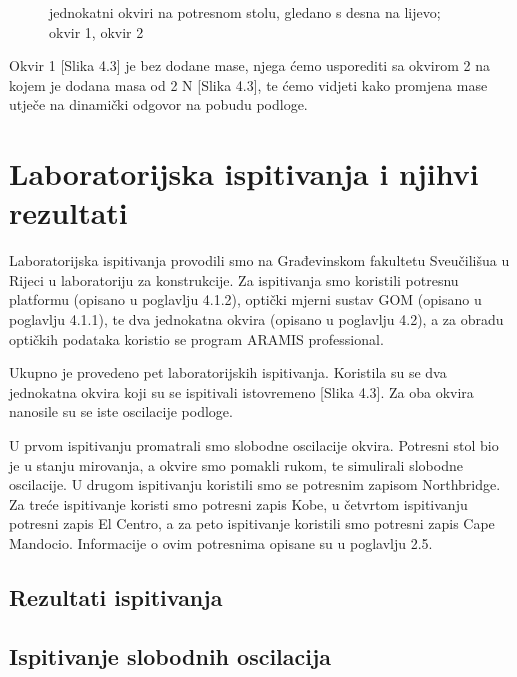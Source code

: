 \documentclass[12pt]{book}
\begin{document}
\begin{figure}[h]
	\centering
	\caption{jednokatni okviri na potresnom stolu, gledano s desna na lijevo; okvir 1, okvir 2}
	\label{fig:whatsapp-image-2023-09-06-at-18}
\end{figure}

Okvir 1 [Slika 4.3] je bez dodane mase, njega ćemo usporediti sa okvirom 2 na kojem je dodana masa od 2 N [Slika 4.3], te ćemo vidjeti kako promjena mase utječe na dinamički odgovor na pobudu podloge.

\chapter{Laboratorijska ispitivanja i njihvi rezultati}

Laboratorijska ispitivanja provodili smo na Građevinskom fakultetu Sveučilišua u Rijeci u laboratoriju za konstrukcije. Za ispitivanja smo koristili potresnu platformu (opisano u poglavlju 4.1.2), optički mjerni sustav GOM (opisano u poglavlju 4.1.1), te dva jednokatna okvira (opisano u poglavlju 4.2), a za obradu optičkih podataka koristio se program ARAMIS professional.

Ukupno je provedeno pet laboratorijskih ispitivanja. Koristila su se dva jednokatna okvira koji su se ispitivali istovremeno [Slika 4.3]. Za oba okvira nanosile su se iste oscilacije podloge. 

U prvom ispitivanju promatrali smo slobodne oscilacije okvira. Potresni stol bio je u stanju mirovanja, a okvire smo pomakli rukom, te simulirali slobodne oscilacije. U drugom ispitivanju koristili smo se potresnim zapisom Northbridge. Za treće ispitivanje koristi smo potresni zapis Kobe, u četvrtom ispitivanju potresni zapis El Centro, a za peto ispitivanje koristili smo potresni zapis Cape Mandocio. Informacije o ovim potresnima opisane su u poglavlju 2.5.

\section{Rezultati ispitivanja}

\section{Ispitivanje slobodnih oscilacija}
\end{document}
